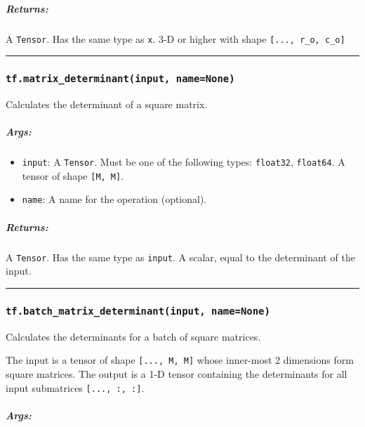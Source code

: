 \subparagraph{Returns: }\label{returns-26}

A \texttt{Tensor}. Has the same type as \texttt{x}. 3-D or higher with
shape \texttt{{[}...,\ r\_o,\ c\_o{]}}

\begin{center}\rule{0.5\linewidth}{\linethickness}\end{center}

\subsubsection{\texorpdfstring{\texttt{tf.matrix\_determinant(input,\ name=None)}
}{tf.matrix\_determinant(input, name=None) }}\label{tf.matrixux5fdeterminantinput-namenone}

Calculates the determinant of a square matrix.

\subparagraph{Args: }\label{args-27}

\begin{itemize}
\tightlist
\item
  \texttt{input}: A \texttt{Tensor}. Must be one of the following types:
  \texttt{float32}, \texttt{float64}. A tensor of shape
  \texttt{{[}M,\ M{]}}.
\item
  \texttt{name}: A name for the operation (optional).
\end{itemize}

\subparagraph{Returns: }\label{returns-27}

A \texttt{Tensor}. Has the same type as \texttt{input}. A scalar, equal
to the determinant of the input.

\begin{center}\rule{0.5\linewidth}{\linethickness}\end{center}

\subsubsection{\texorpdfstring{\texttt{tf.batch\_matrix\_determinant(input,\ name=None)}
}{tf.batch\_matrix\_determinant(input, name=None) }}\label{tf.batchux5fmatrixux5fdeterminantinput-namenone}

Calculates the determinants for a batch of square matrices.

The input is a tensor of shape \texttt{{[}...,\ M,\ M{]}} whose
inner-most 2 dimensions form square matrices. The output is a 1-D tensor
containing the determinants for all input submatrices
\texttt{{[}...,\ :,\ :{]}}.

\subparagraph{Args: }\label{args-28}


